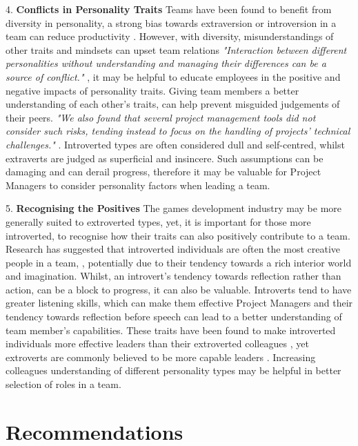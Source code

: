\documentclass{scrartcl}
\begin{document}
4.	\textbf{Conflicts in Personality Traits} \newline
Teams have been found to benefit from diversity in personality, a strong bias towards extraversion or introversion in a team can reduce productivity \cite{Hoffman}. However, with diversity, misunderstandings of other traits and mindsets can upset team relations \textit{"Interaction between different personalities without understanding and managing their differences can be a source of conflict."} \cite[p. 67]{LicorishPhilpottMacDonel}, it may be helpful to educate employees in the positive and negative impacts of personality traits. Giving team members a better understanding of each other's traits, can help prevent misguided judgements of their peers. \textit{"We also found that several project management tools did not consider such risks, tending instead to focus on the handling of projects' technical challenges."} \cite[p. 72]{LicorishPhilpottMacDonel}. Introverted types are often considered dull and self-centred, whilst extraverts are judged as superficial and insincere. Such assumptions can be damaging and can derail progress, therefore it may be valuable for Project Managers to consider personality factors when leading a team.


5.	\textbf{Recognising the Positives} \newline
The games development industry may be more generally suited to extroverted types, yet, it is important for those more introverted, to recognise how their traits can also positively contribute to a team. Research has suggested that introverted individuals are often the most creative people in a team, \cite{feist}, potentially due to their tendency towards a rich interior world and imagination. Whilst, an introvert's tendency towards reflection rather than action, can be a block to progress, it can also be valuable. Introverts tend to have greater listening skills, which can make them effective Project Managers and their tendency towards reflection before speech can lead to a better understanding of team member's capabilities. These traits have been found to make introverted individuals more effective leaders than their extroverted colleagues \cite{Morrish}, yet extroverts are commonly believed to be more capable leaders \cite{Cain}. Increasing colleagues understanding of different personality types may be helpful in better selection of roles in a team.

\section{Recommendations}
\end{document}
